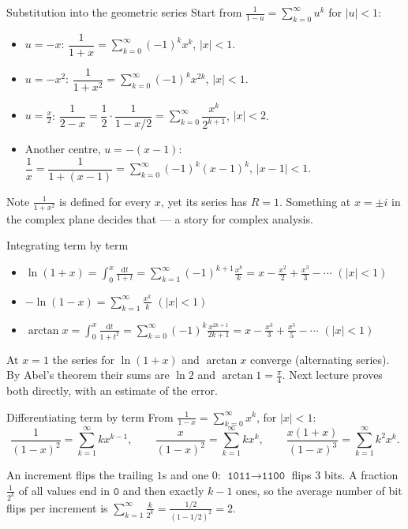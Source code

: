 \documentclass[10pt]{wosm-slides}
\begin{document}
\begin{frame}{Substitution into the geometric series}
  Start from $\frac{1}{1-u} = \sum_{k=0}^\infty u^k$ for $|u| < 1$:
  \begin{itemize}
    \item $u = -x$: \quad
      $\dfrac{1}{1+x} = \sum_{k=0}^\infty (-1)^k x^k$, \quad $|x| < 1$.
    \item $u = -x^2$: \quad
      $\dfrac{1}{1+x^2} = \sum_{k=0}^\infty (-1)^k x^{2k}$, \quad $|x| < 1$.
    \item $u = \frac{x}{2}$: \quad
      $\dfrac{1}{2-x} = \dfrac12 \cdot \dfrac{1}{1 - x/2} = \sum_{k=0}^\infty \dfrac{x^k}{2^{k+1}}$,
      \quad $|x| < 2$.
    \item Another centre, $u = -(x-1)$: \quad
      $\dfrac1x = \dfrac{1}{1 + (x-1)} = \sum_{k=0}^\infty (-1)^k (x-1)^k$, \quad $|x - 1| < 1$.
  \end{itemize}
  \pause
  {\small Note $\frac{1}{1+x^2}$ is defined for every $x$, yet its series has $R = 1$.
  Something at $x = \pm i$ in the complex plane decides that --- a story for complex analysis.\par}
\end{frame}

\begin{frame}{Integrating term by term}
  \begin{itemize}
    \item $\displaystyle\ln(1 + x) = \int_0^x \frac{\mathrm{d}t}{1+t}
      = \sum_{k=1}^\infty (-1)^{k+1} \frac{x^k}{k} = x - \frac{x^2}{2} + \frac{x^3}{3} - \cdots$
      \quad $(|x| < 1)$
    \item $\displaystyle -\ln(1 - x) = \sum_{k=1}^\infty \frac{x^k}{k}$ \quad $(|x| < 1)$
    \item $\displaystyle\arctan x = \int_0^x \frac{\mathrm{d}t}{1+t^2}
      = \sum_{k=0}^\infty (-1)^k \frac{x^{2k+1}}{2k+1} = x - \frac{x^3}{3} + \frac{x^5}{5} - \cdots$
      \quad $(|x| < 1)$
  \end{itemize}
  \pause
  \begin{remark}
    At $x = 1$ the series for $\ln(1+x)$ and $\arctan x$ converge (alternating series).
    By Abel's theorem their sums are $\ln 2$ and $\arctan 1 = \frac\pi4$. Next lecture
    proves both directly, with an estimate of the error.
  \end{remark}
\end{frame}

\begin{frame}{Differentiating term by term}
  From $\frac{1}{1-x} = \sum_{k=0}^\infty x^k$, for $|x| < 1$:
  \[ \frac{1}{(1-x)^2} = \sum_{k=1}^\infty k x^{k-1}, \qquad
     \frac{x}{(1-x)^2} = \sum_{k=1}^\infty k x^k, \qquad
     \frac{x(1+x)}{(1-x)^3} = \sum_{k=1}^\infty k^2 x^k . \]
  \pause
  \begin{example}
    An increment flips the trailing $1$s and one $0$: $\texttt{1011} \to \texttt{1100}$ flips
    $3$ bits. A fraction $\frac{1}{2^k}$ of all values end in $\texttt{0}$ and then exactly $k - 1$
    ones, so the average number of bit flips per increment is
    $\sum_{k=1}^\infty \frac{k}{2^k} = \frac{1/2}{(1 - 1/2)^2} = 2$.
  \end{example}
\end{frame}
\end{document}
